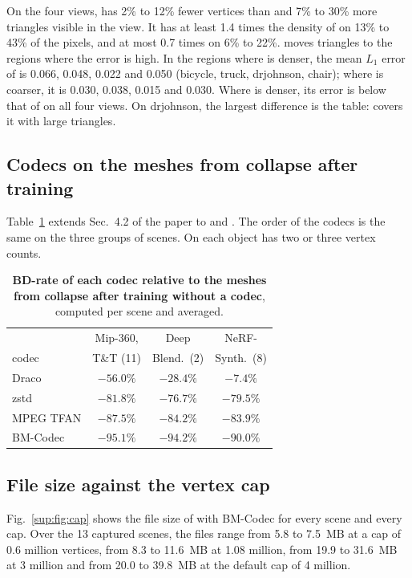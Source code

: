 On the four views, \BM has 2\% to 12\% fewer vertices than \MSc and 7\% to 30\% more triangles visible in the view. It has at least 1.4 times the density of \MSc on 13\% to 43\% of the pixels, and at most 0.7 times on 6\% to 22\%. \BM moves triangles to the regions where the error is high. In the regions where \BM is denser, the mean $L_1$ error of \MSc is 0.066, 0.048, 0.022 and 0.050 (bicycle, truck, drjohnson, chair); where \BM is coarser, it is 0.030, 0.038, 0.015 and 0.030. Where \BM is denser, its error is below that of \MSc on all four views. On drjohnson, the largest difference is the table: \MSc covers it with large triangles.


\subsection{Codecs on the meshes from collapse after training}
Table~\ref{sup:tab:collapse-bd} extends Sec.~4.2 of the paper to \DeepBlending and \NeRFSyn. The order of the codecs is the same on the three groups of scenes. On \NeRFSyn each object has two or three vertex counts.

\begin{table}[!htb]\centering\footnotesize
\caption{\textbf{BD-rate of each codec relative to the meshes from collapse after training without a codec}, computed per scene and averaged.}
\label{sup:tab:collapse-bd}
\begin{tabular}{@{}lccc@{}}
\toprule
 & Mip-360, & Deep & NeRF- \\
codec & T\&T (11) & Blend.\ (2) & Synth.\ (8) \\
\midrule
Draco & $-56.0\%$ & $-28.4\%$ & $-7.4\%$ \\
zstd & $-81.8\%$ & $-76.7\%$ & $-79.5\%$ \\
MPEG TFAN & $-87.5\%$ & $-84.2\%$ & $-83.9\%$ \\
BM-Codec & $-95.1\%$ & $-94.2\%$ & $-90.0\%$ \\
\bottomrule
\end{tabular}
\end{table}

\subsection{File size against the vertex cap}
Fig.~\ref{sup:fig:cap} shows the file size of \MSc with BM-Codec for every scene and every cap. Over the 13 captured scenes, the files range from 5.8 to 7.5~MB at a cap of 0.6 million vertices, from 8.3 to 11.6~MB at 1.08 million, from 19.9 to 31.6~MB at 3 million and from 20.0 to 39.8~MB at the default cap of 4 million.

